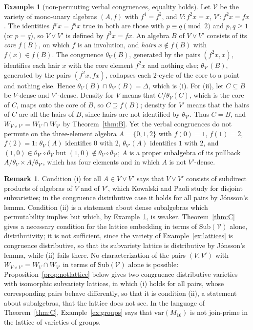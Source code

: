 \documentclass[11pt]{amsart}
\theoremstyle{definition}
\newtheorem{rem}[thm]{Remark}
\newtheorem{ex}[thm]{Example}
\newcommand{\Sub}{\mathrm{Sub}}
\newcommand{\sV}{\mathcal V}
\newcommand{\var}{\mathrm{var}}
\begin{document}
\begin{ex}[non-permuting verbal congruences, equality holds]\label{ex:unary}
Let $\sV$ be the variety of mono-unary algebras $(A,f)$ with $f^4=f^2$, and
$V\colon f^2x=x$, $V'\colon f^2x=fx$. The identities $f^px=f^qx$ true in both
are those with $p\equiv q\pmod 2$ and $p,q\ge1$ (or $p=q$), so
$V\vee V'$ is defined by $f^3x=fx$. An algebra $B$ of $V\vee V'$ consists of its
\emph{core} $f(B)$, on which $f$ is an involution, and \emph{hairs}
$x\notin f(B)$ with $f(x)\in f(B)$. The congruence $\theta_V(B)$, generated by
the pairs $(f^2x,x)$, identifies each hair $x$ with the core element $f^2x$ and
nothing else; $\theta_{V'}(B)$, generated by the pairs $(f^2x,fx)$, collapses
each $2$-cycle of the core to a point and nothing else. Hence
$\theta_V(B)\cap\theta_{V'}(B)=\Delta$, which is (i). For (ii), let
$C\subseteq B$ be $V$-dense and $V'$-dense. Density for $V$ means that
$C/\theta_V(C)$, which is the core of $C$, maps onto the core of $B$, so
$C\supseteq f(B)$; density for $V'$ means that the hairs of $C$ are all the
hairs of $B$, since hairs are not identified by $\theta_{V'}$. Thus $C=B$, and
$W_{V\vee V'}=W_V\cap W_{V'}$ by Theorem~\ref{thm:B}. Yet the verbal
congruences do not permute on the three-element algebra $A=\{0,1,2\}$ with
$f(0)=1$, $f(1)=2$, $f(2)=1$: $\theta_V(A)$ identifies $0$ with $2$,
$\theta_{V'}(A)$ identifies $1$ with $2$, and $(1,0)\in\theta_{V'}\circ\theta_V$
but $(1,0)\notin\theta_V\circ\theta_{V'}$; $A$ is a proper subalgebra of its
pullback $A/\theta_V\times A/\theta_{V'}$, which has four elements and in
which $A$ is not $V'$-dense.
\end{ex}

\begin{rem}
Condition (i) for all $A\in V\vee V'$ says that $V\vee V'$ consists of
subdirect products of algebras of $V$ and of $V'$, which Kowalski and Paoli
\cite{KP} study for disjoint subvarieties; in the congruence distributive case
it holds for all pairs by Jónsson's lemma. Condition (ii) is a statement about
dense subalgebras which permutability implies but which, by
Example~\ref{ex:unary}, is weaker. Theorem~\ref{thm:C} gives a necessary
condition for the lattice embedding in terms of $\Sub(\sV)$ alone,
distributivity; it is not sufficient, since the variety of
Example~\ref{ex:lattices} is congruence distributive, so that its subvariety
lattice is distributive by Jónsson's lemma, while (ii) fails there. No
characterization of the pairs $(V,V')$ with $W_{V\vee V'}=W_V\cap W_{V'}$ in
terms of $\Sub(\sV)$ alone is possible: Proposition~\ref{prop:notlattice}
below gives two congruence distributive varieties with isomorphic subvariety
lattices, in which (i) holds for all pairs, whose corresponding pairs behave
differently, so that it is condition (ii), a statement about subalgebras,
that the lattice does not see. In the language of Theorem~\ref{thm:C},
Example~\ref{ex:groups} says that $\var(M_{16})$ is not join-prime in the
lattice of varieties of groups.
\end{rem}
\end{document}
